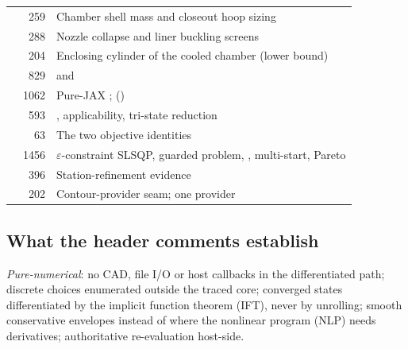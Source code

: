{\begin{longtable}{@{}P{3.6cm}r P{11.2cm}@{}}
 & 259 & Chamber shell mass and closeout hoop sizing\\
 & 288 & Nozzle collapse and liner buckling screens\\
 & 204 & Enclosing cylinder of the cooled chamber (lower bound)\\
 & 829 &  and \\
 & 1062 & Pure-JAX ;  ()\\
 & 593 & , applicability, tri-state reduction\\
 & 63 & The two objective identities\\
 & 1456 & $\varepsilon$-constraint SLSQP, guarded problem, , multi-start, Pareto\\
 & 396 & Station-refinement evidence\\
 & 202 & Contour-provider seam; one provider \\
\bottomrule
\end{longtable}
}

\subsection{What the header comments establish}\label{sec:s13-comments}

\emph{Pure-numerical}: no CAD, file I/O or host callbacks in the differentiated path; discrete choices enumerated outside the traced core; converged states differentiated by the implicit function theorem (IFT), never by unrolling; smooth conservative envelopes instead of  where the nonlinear program (NLP) needs derivatives; authoritative re-evaluation host-side.

